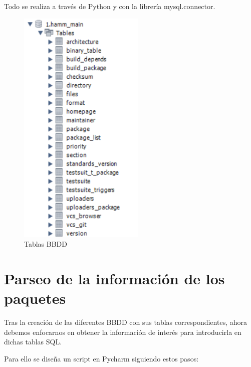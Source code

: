 \documentclass[a4paper, 12pt]{book}
\begin{document}
\begin{itemize}
	Todo se realiza a través de Python y con la librería mysql.connector.
	
	\begin{figure}
		\centering
		\includegraphics[width=6cm, keepaspectratio]{img/Tablas.png}
		\caption{Tablas BBDD}
		\label{fig:Tablas}
	\end{figure}
	
	

	
\end{itemize}

\section{Parseo de la información de los paquetes} 
\label{sec:parseo}
Tras la creación de las diferentes BBDD con sus tablas correspondientes, ahora debemos enfocarnos en obtener la información de interés para introducirla en dichas tablas SQL.

Para ello se diseña un script en Pycharm siguiendo estos pasos:
\end{document}
